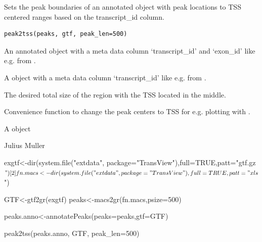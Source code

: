 \documentclass[letterpaper]{book}
\begin{document}
%
\begin{Description}
Sets the peak boundaries of an annotated  object with peak locations to TSS centered ranges based on the transcript\_id column.
\end{Description}
%
\begin{Usage}
\begin{verbatim}
peak2tss(peaks, gtf, peak_len=500)
\end{verbatim}
\end{Usage}
%
\begin{Arguments}
\begin{ldescription}
\item[\code{peaks}] 
An annotated  object with a meta data column `transcript\_id' and `exon\_id' like e.g. from .

\item[\code{gtf}] 
A  object with a meta data column `transcript\_id' like e.g. from .

\item[\code{peak\_len}] 
The desired total size of the region with the TSS located in the middle.

\end{ldescription}
\end{Arguments}
%
\begin{Details}
Convenience function to change the peak centers to TSS for e.g. plotting with .
\end{Details}
%
\begin{Value}
A  object
\end{Value}
%
\begin{Author}
Julius Muller 
\end{Author}
%
\begin{Examples}
\begin{ExampleCode}

exgtf<-dir(system.file("extdata", package="TransView"),full=TRUE,patt="gtf.gz$")[2]
fn.macs<-dir(system.file("extdata", package="TransView"),full=TRUE,patt="xls$")

GTF<-gtf2gr(exgtf)
peaks<-macs2gr(fn.macs,psize=500)

peaks.anno<-annotatePeaks(peaks=peaks,gtf=GTF)

peak2tss(peaks.anno, GTF, peak_len=500)

\end{ExampleCode}
\end{Examples}
\end{document}
